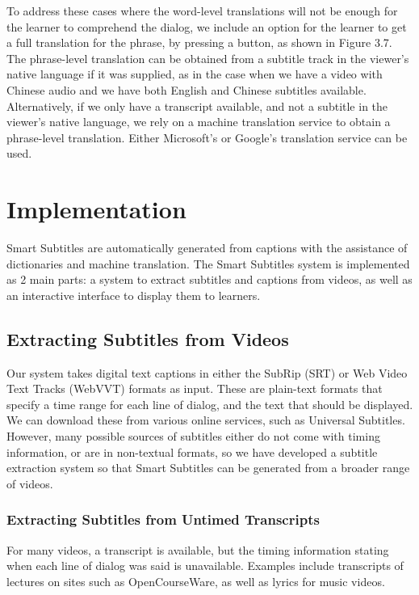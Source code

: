 \documentclass{sigchi}
\begin{document}
To address these cases where the word-level translations will not be enough for the learner to comprehend the dialog, we include an option for the learner to get a full translation for the phrase, by pressing a button, as shown in Figure 3.7. The phrase-level translation can be obtained from a subtitle track in the viewer's native language if it was supplied, as in the case when we have a video with Chinese audio and we have both English and Chinese subtitles available. Alternatively, if we only have a transcript available, and not a subtitle in the viewer's native language, we rely on a machine translation service to obtain a phrase-level translation. Either Microsoft's or Google's translation service can be used.

\section{Implementation}

Smart Subtitles are automatically generated from 
captions with the assistance of dictionaries and 
machine translation. The Smart Subtitles system
is implemented as 2 main parts:
a system to extract subtitles and captions from videos, as well as an interactive interface to display them to learners.

\subsection{Extracting Subtitles from Videos}

Our system takes digital text captions in either the 
SubRip (SRT) or Web Video Text Tracks (WebVVT) formats as input.
These are plain-text formats that specify a time range for each 
line of dialog, and the text that should be displayed.
We can download these from
various online services, such as Universal Subtitles.
However, many possible sources of subtitles either
do not come with timing information, or are in
non-textual formats, so we have developed 
a subtitle extraction system so that Smart Subtitles
can be generated from a broader range of videos.

\subsubsection{Extracting Subtitles from Untimed Transcripts}

For many videos, a transcript is available, but the timing information
stating when each line of dialog was said is unavailable.
Examples include transcripts of lectures on sites such as
OpenCourseWare, as well as lyrics for music videos.
\end{document}
